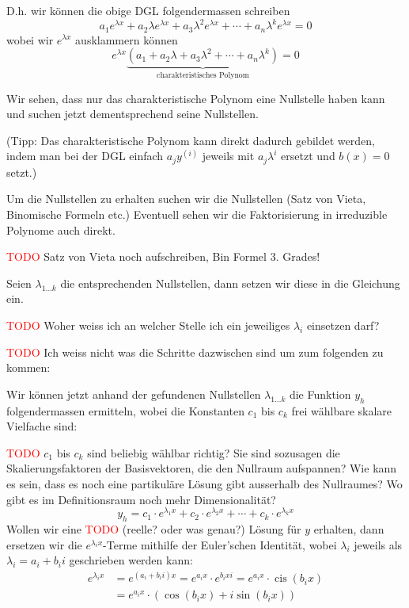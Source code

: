 \documentclass[a4paper,landscape,8pt]{extarticle}
\newcommand{\todo}{\textcolor{red}{TODO }}
\DeclareMathOperator{\cis}{cis}
\begin{document}
\begin{multicols*}{4}
\begin{warmup}
\begin{warmup}
\begin{enumerate}[label=(\arabic*)]
  D.h. wir können die obige DGL folgendermassen schreiben
  \[
  a_1 e^{\lambda x} + a_2\lambda e^{\lambda x} + a_3\lambda^2e^{\lambda x} +
  \cdots + a_n\lambda^{k}e^{\lambda x} = 0
  \]
  wobei wir $e^{\lambda x}$ ausklammern können
  \[
  e^{\lambda x}\underbrace{(a_1 + a_2\lambda  + a_3\lambda^2 + \cdots +
  a_n\lambda^{k})}_{\text{charakteristisches Polynom}} = 0
  \]
  
  Wir sehen, dass nur das charakteristische Polynom eine Nullstelle haben kann
  und suchen jetzt dementsprechend seine Nullstellen.
  
  (Tipp: Das charakteristische Polynom kann direkt dadurch gebildet werden,
  indem man bei der DGL einfach $a_jy^{(i)}$ jeweils mit $a_j\lambda^{i}$
  ersetzt und $b(x)=0$ setzt.)
  
  Um die Nullstellen zu erhalten suchen wir die Nullstellen (Satz von
  Vieta, Binomische Formeln etc.) Eventuell sehen wir die Faktorisierung in
  irreduzible Polynome auch direkt.
  
  \todo Satz von Vieta noch aufschreiben, Bin Formel 3. Grades!
  
  Seien $\lambda_{1\ldots k}$ die entsprechenden Nullstellen, dann setzen wir
  diese in die Gleichung ein.
  
  \todo Woher weiss ich an welcher Stelle ich ein jeweiliges $\lambda_i$
  einsetzen darf?
  
  \todo Ich weiss nicht was die Schritte dazwischen sind um zum folgenden zu
  kommen:
  
  Wir können jetzt anhand der gefundenen Nullstellen $\lambda_{1\ldots k}$ die
  Funktion $y_h$ folgendermassen ermitteln, wobei die Konstanten $c_1$ bis
  $c_k$ frei wählbare skalare Vielfache sind:
  
  \todo $c_1$ bis $c_k$ sind beliebig wählbar richtig? Sie sind sozusagen
  die Skalierungsfaktoren der Basisvektoren, die den Nullraum aufspannen? Wie
  kann es sein, dass es noch eine partikuläre Lösung gibt ausserhalb des
  Nullraumes? Wo gibt es im Definitionsraum noch mehr Dimensionalität?
  \[
  	y_h = c_1\cdot e^{\lambda_1x} + c_2\cdot e^{\lambda_2x} + \cdots + c_k\cdot
  	e^{\lambda_k x}
  \]
  Wollen wir eine \todo (reelle? oder was genau?) Lösung für $y$ erhalten, dann
  ersetzen wir die $e^{\lambda_i x}$-Terme mithilfe der Euler'schen Identität,
   wobei $\lambda_i$ jeweils als $\lambda_i=a_i + b_ii$ geschrieben werden kann:
  \begin{align*}
  e^{\lambda_i x} &=
  e^{(a_i + b_i i)x} = e^{a_ix}\cdot e^{b_ixi}=e^{a_ix}\cdot \cis(b_ix)\\
  &= e^{a_ix} \cdot(\cos(b_ix)+i\sin(b_ix))
  \end{align*}
  

\end{enumerate}
\end{warmup}
\end{warmup}
\end{multicols*}
\end{document}
